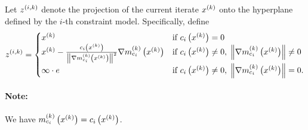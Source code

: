 Let ${z^{(i, k)}}$ denote the projection of the current iterate $x^{(k)}$ onto the hyperplane defined by the $i$-th constraint model.
Specifically, define
\begin{align}
\label{define_z}
{z^{(i, k)}} =
\begin{cases}
x^{(k)} &  \text{if } c_i\left(x^{(k)}\right) = 0 \\
x^{(k)} - \frac{c_i\left(x^{(k)}\right)}{\left\|{\nabla m_{c_i}^{(k)}\left(x^{(k)}\right)}\right\|^2} {\nabla m_{c_i}^{(k)}\left(x^{(k)}\right)}&  \text{if } c_i\left(x^{(k)}\right) \ne 0, \; \left\|{\nabla m_{c_i}^{(k)}\left(x^{(k)}\right)}\right\| \ne 0 \\
\mathbf{\infty}\cdot e & \text{if } c_i\left(x^{(k)}\right) \ne 0,  \;  \left\|{\nabla m_{c_i}^{(k)}\left(x^{(k)}\right)}\right\| = 0. \\
\end{cases}
\end{align}

\paragraph*{Note:}
We have $m^{(k)}_{c_i}\left(x^{(k)}\right) = c_i\left(x^{(k)}\right)$.

%

